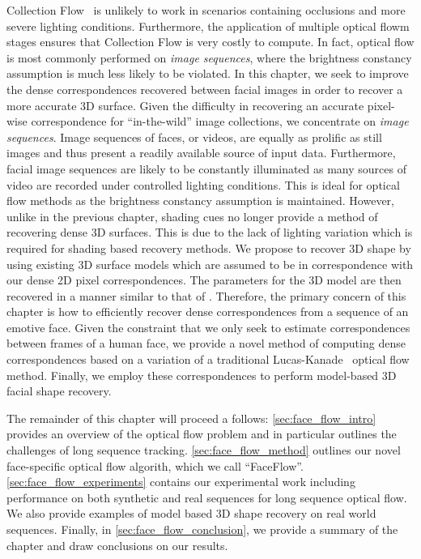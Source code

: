 Collection Flow~\cite{kemelmacher2012collection} is unlikely to work in
scenarios containing occlusions and more severe lighting conditions.
Furthermore, the application of multiple optical flowm stages ensures that Collection
Flow is very costly to compute. In fact, optical flow is most commonly performed
on \textit{image sequences}, where the brightness constancy assumption is
much less likely to be violated. In this chapter, we seek to improve the dense
correspondences recovered between facial images in order to recover a more
accurate 3D surface. Given the difficulty in recovering an accurate pixel-wise
correspondence for ``in-the-wild'' image collections, we concentrate on
\textit{image sequences}. Image sequences of faces, or videos, are equally
as prolific as still images and thus present a readily available source of
input data. Furthermore, facial image sequences are likely to be constantly
illuminated as many sources of video are recorded under controlled lighting
conditions. This is ideal for optical flow methods as the brightness constancy
assumption is maintained. However, unlike in the previous chapter, shading cues
no longer provide a method of recovering dense 3D surfaces. This is due
to the lack of lighting variation which is required for shading based
recovery methods. We propose to recover 3D shape by using existing 3D
surface models which are assumed to be in correspondence with our dense 2D pixel
correspondences. The parameters for the 3D model are then recovered in a manner
similar to that of \citet{aldrian2010linear,aldrian2013inverse}. Therefore,
the primary concern of this chapter is how to efficiently recover dense 
correspondences from a sequence of an emotive face. Given the constraint
that we only seek to estimate correspondences between frames of a human face,
we provide a novel method of computing dense correspondences based on a variation
of a traditional Lucas-Kanade~\cite{lucas1981iterative} optical flow method.
Finally, we employ these correspondences to perform model-based 3D facial shape
recovery.

The remainder of this chapter will proceed a follows: \cref{sec:face_flow_intro}
provides an overview of the optical flow problem and in particular
outlines the challenges of long sequence tracking. \cref{sec:face_flow_method}
outlines our novel face-specific optical flow algorith, which we call
``FaceFlow''. \cref{sec:face_flow_experiments} contains our experimental work
including performance on both synthetic and real sequences for long
sequence optical flow. We also provide examples of model based 3D shape recovery
on real world sequences. Finally, in \cref{sec:face_flow_conclusion},
we provide a summary of the chapter and draw conclusions on our results.
{






}
\stopcontents[chapters]
